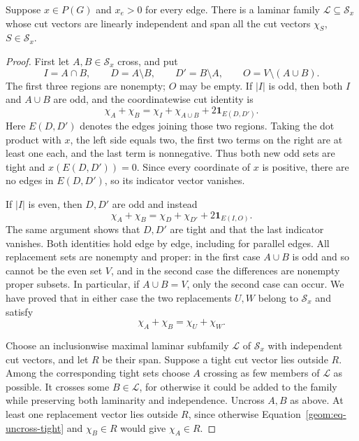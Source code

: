 \begin{lemma}
\label{geom:lem-laminar}
Suppose \(x\in P(G)\) and \(x_e>0\) for every edge. There is a
laminar family \(\mathcal L\subseteq\mathcal S_x\) whose cut
vectors are linearly independent and span all the cut vectors
\(\chi_S\), \(S\in\mathcal S_x\).
\end{lemma}

\begin{proof}
First let \(A,B\in\mathcal S_x\) cross, and put
\[
 I=A\cap B,\qquad D=A\setminus B,\qquad
 D'=B\setminus A,\qquad O=V\setminus(A\cup B).
\]
The first three regions are nonempty; \(O\) may be empty. If
\(|I|\) is odd, then both \(I\) and \(A\cup B\) are odd, and
the coordinatewise cut identity is
\begin{equation}
\label{geom:eq-uncross-intersection}
 \chi_A+\chi_B=
 \chi_I+\chi_{A\cup B}+2\mathbf1_{E(D,D')}.
\end{equation}
Here \(E(D,D')\) denotes the edges joining those two regions.
Taking the dot product with \(x\), the left side equals two, the
first two terms on the right are at least one each, and the last
term is nonnegative. Thus both new odd sets are tight and
\(x(E(D,D'))=0\). Since every coordinate of \(x\) is positive,
there are no edges in \(E(D,D')\), so its indicator vector vanishes.

If \(|I|\) is even, then \(D,D'\) are odd and instead
\begin{equation}
\label{geom:eq-uncross-difference}
 \chi_A+\chi_B=
 \chi_D+\chi_{D'}+2\mathbf1_{E(I,O)}.
\end{equation}
The same argument shows that \(D,D'\) are tight and that the last
indicator vanishes. Both identities hold edge by edge, including
for parallel edges. All replacement sets are nonempty and proper:
in the first case \(A\cup B\) is odd and so cannot be the even set
\(V\), and in the second case the differences are nonempty proper
subsets. In particular, if \(A\cup B=V\), only the second case can
occur. We have proved that in either case the two replacements
\(U,W\) belong to \(\mathcal S_x\) and satisfy
\begin{equation}
\label{geom:eq-uncross-tight}
 \chi_A+\chi_B=\chi_U+\chi_W.
\end{equation}

Choose an inclusionwise maximal laminar subfamily \(\mathcal L\)
of \(\mathcal S_x\) with independent cut vectors, and let \(R\)
be their span. Suppose a tight cut vector lies outside \(R\).
Among the corresponding tight sets choose \(A\) crossing as few
members of \(\mathcal L\) as possible. It crosses some
\(B\in\mathcal L\), for otherwise it could be added to the family
while preserving both laminarity and independence. Uncross \(A,B\)
as above. At least one replacement vector lies outside \(R\), since
otherwise Equation~\eqref{geom:eq-uncross-tight} and \(\chi_B\in R\)
would give \(\chi_A\in R\).


\end{proof}
